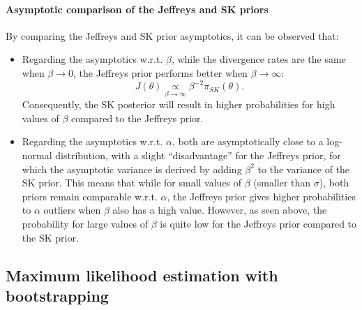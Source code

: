 \paragraph{Asymptotic comparison of the Jeffreys and SK priors} 
By comparing the Jeffreys and SK prior asymptotics, it can be observed that:
    \begin{itemize}
        \item Regarding the asymptotics w.r.t. $\beta$, while the divergence rates are the same when $\beta\to0$, the Jeffreys prior performs better when $\beta\to\infty$:
            \begin{equation}
                J(\theta) \underset{\beta\rightarrow\infty}{\propto} \beta^{-2}\pi_{SK}(\theta).
            \end{equation}
        Consequently, the SK posterior will result in higher probabilities for high values of $\beta$ compared to the Jeffreys prior.
        \item Regarding the asymptotics w.r.t. $\alpha$, both are asymptotically close to a log-normal distribution, with a slight ``disadvantage'' for the Jeffreys prior, for which the asymptotic variance is derived by adding $\beta^2$ to the variance of the SK prior. This means that while for small values of $\beta$ (smaller than $\sigma$), both priors remain comparable w.r.t. $\alpha$, the Jeffreys prior gives higher probabilities to $\alpha$ outliers when $\beta$ also has a high value. However, as seen above, the probability for large values of $\beta$ is quite low for the Jeffreys prior compared to the SK prior. %
    \end{itemize}


%


    \subsection{Maximum likelihood estimation with bootstrapping}

